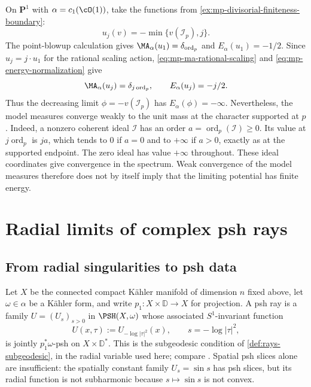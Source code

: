 \begin{example}\label{ex:mp-infinite-energy-endpoint}
On $\mathbf P^1$ with $\alpha=c_1(\cO(1))$, take the functions from \cref{ex:mp-divisorial-finiteness-boundary}:
\[
                 u_j(v)=-\min\{v(\mathcal I_p),j\}.
\]
The point-blowup calculation gives $\MA_\alpha(u_1)=\delta_{\operatorname{ord}_p}$ and $E_\alpha(u_1)=-1/2$. Since $u_j=j\cdot u_1$ for the rational scaling action, \eqref{eq:mp-ma-rational-scaling} and \eqref{eq:mp-energy-normalization} give
\[
 \MA_\alpha(u_j)=\delta_{j\operatorname{ord}_p},\qquad
 E_\alpha(u_j)=-j/2.
\]
Thus the decreasing limit $\phi=-v(\mathcal I_p)$ has $E_\alpha(\phi)=-\infty$. Nevertheless, the model measures converge weakly to the unit mass at the character supported at $p$. Indeed, a nonzero coherent ideal $\mathcal I$ has an order $a=\operatorname{ord}_p(\mathcal I)\geq0$. Its value at $j\operatorname{ord}_p$ is $ja$, which tends to $0$ if $a=0$ and to $+\infty$ if $a>0$, exactly as at the supported endpoint. The zero ideal has value $+\infty$ throughout. These ideal coordinates give convergence in the spectrum. Weak convergence of the model measures therefore does not by itself imply that the limiting potential has finite energy.
\end{example}

\section{Radial limits of complex psh rays}
\label{sec:mp-psh-rays}
\subsection{From radial singularities to psh data}
\label{subsec:mp-psh-radial-data}



Let $X$ be the connected compact K\"ahler manifold of dimension $n$ fixed above, let $\omega\in\alpha$ be a K\"ahler form, and write $p_1:X\times\mathbb D\to X$ for projection. A psh ray is a family $U=(U_s)_{s>0}$ in $\PSH(X,\omega)$ whose associated $S^1$-invariant function
\[
 U(x,\tau):=U_{-\log|\tau|^2}(x),\qquad s=-\log|\tau|^2,
\]
is jointly $p_1^*\omega$-psh on $X\times\mathbb D^*$. This is the subgeodesic condition of \cref{def:rays-subgeodesic}, in the radial variable used here; compare \cite[Section~5.1.1]{MPTropicalV2}. Spatial psh slices alone are insufficient: the spatially constant family $U_s=\sin s$ has psh slices, but its radial function is not subharmonic because $s\mapsto\sin s$ is not convex.

